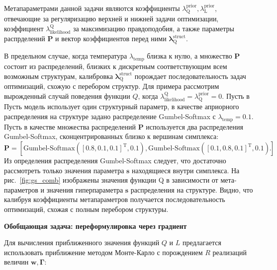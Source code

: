 Метапараметрами данной задачи являются коэффициенты $\lambda^\text{prior}_\text{Q}, \lambda^\text{prior}_\text{L}$, отвечающие за регуляризацию верхней и нижней задачи оптимизации, коэффициент $\lambda_\text{likelihood}^\text{Q}$ за максимизацию правдоподобия, а также параметры распрделений $\mathbf{P}$ и вектор коэффициентов перед ними $\boldsymbol{\lambda}^\text{struct}_\text{Q}$. 

В предельном случае, когда температура $\lambda_\text{temp}$ близка к нулю, а множество $\mathbf{P}$ состоит из распределений, близких к дискретным соответствующим всем возможным структурам, калибровка $\boldsymbol{\lambda}^\text{struct}_\text{Q}$ порождает последовательность задач оптимизаций, схожую с перебором структур.  Для примера рассмотрим вырожденный случай поведения функции $Q$, когда $\lambda_\text{likelihood}^\text{Q} = \lambda^\text{prior}_\text{Q} = 0$. Пусть в Пусть модель использует один структурный параметр, в качестве априорного распределения на структуре задано распределение Gumbel-Softmax с $\lambda_\text{temp}=0.1$. Пусть в качестве множества распределений $\mathbf{P}$ используется два распределения Gumbel-Softmax, сконцентрированных близко к вершинам симплекса:
\[
    \mathbf{P} = [\text{Gumbel-Softmax}([0.8, 0.1, 0.1]^\text{T}, 0.1) ,\text{Gumbel-Softmax}([0.1, 0.8, 0.1]^\text{T}, 0.1)].
\]
Из определения распределения Gumbel-Softmax следует, что достаточно рассмотреть только значения параметра $\mathbf{s}$ находящиеся внутри симплекса.
На рис.~\ref{fig:gs_comb} изображены значения функции Q в зависимости от мета-параметров и значения гиперпараметра $\mathbf{s}$ распределения на структуре. Видно, что калибруя коэффициенты метапараметров получается последовательность оптимизаций, схожая с полным перебором структуры.


\textbf{Обобщающая задача: переформулировка через градиент}



Для вычисления приближенного значения функций $Q$ и $L$ предлагается использовать приближение методом Монте-Карло с порождением $R$ реализаций величин $\mathbf{w}, \boldsymbol{\Gamma}$:

